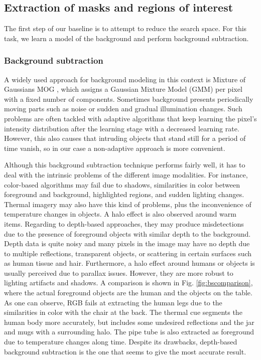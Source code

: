 \documentclass[10pt,twocolumn,letterpaper]{article}
\begin{document}
\subsection{Extraction of masks and regions of interest} 
\label{ssec:bsbb}

The first step of our baseline is to attempt to reduce the search space. For this task, we learn a model of the background and perform background subtraction.

\subsubsection{Background subtraction}
\label{sect:bs}
 A widely used approach for background modeling in this context is Mixture of Gaussians MOG  \cite{bouwmans2008background}, which assigns a Gaussian Mixture Model (GMM) per pixel with a fixed number of components. Sometimes background presents periodically moving parts such as noise or sudden and gradual illumination changes. Such problems are often tackled with adaptive algorithms that keep learning the pixel's intensity distribution after the learning stage with a decreased learning rate. However, this also causes that intruding objects that stand still for a period of time vanish, so in our case a non-adaptive approach is more convenient.

Although this background subtraction technique performs fairly well, it has to deal with the intrinsic problems of the different image modalities. For instance, color-based algorithms may fail due to shadows, similarities in color between foreground and background, highlighted regions, and sudden lighting changes. Thermal imagery may also have this kind of problems, plus the inconvenience of temperature changes in objects. A halo effect is also observed around warm items. Regarding to depth-based approaches, they may produce misdetections due to the presence of foreground objects with similar depth to the background. Depth data is quite noisy and many pixels in the image may have no depth due to multiple reflections, transparent objects, or scattering in certain surfaces such as human tissue and hair. Furthermore, a halo effect around humans or objects is usually perceived due to parallax issues. However, they are more robust to lighting artifacts and shadows. A comparison is shown in Fig. \ref{fig:bscomparison}, where the actual foreground objects are the human and the objects on the table. As one can observe, RGB fails at extracting the human legs due to the similarities in color with the chair at the back. The thermal cue segments the human body more accurately, but includes some undesired reflections and the jar and mugs with a surrounding halo. The pipe tube is also extracted as foreground due to temperature changes along time. Despite its drawbacks, depth-based background subtraction is the one that seems to give the most accurate result. 
\end{document}

